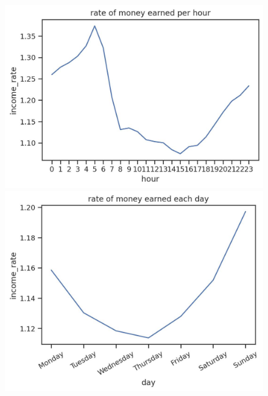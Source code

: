 \documentclass[11pt]{article}
\begin{document}
\begin{figure}[H]
\centering
\begin{minipage}{.5\textwidth}
  \centering
  \includegraphics[scale=0.5]{plots/rate of money earned per hour.jpg}
  \caption{}
  \label{fig:by:table}
\end{minipage}%
\begin{minipage}{.5\textwidth}
  \centering
  \includegraphics[width=.8\textwidth]{plots/rate of money earned each day.jpg}
  \caption{}
  \label{fig:by:table}
\end{minipage}
\end{figure}
\end{document}
